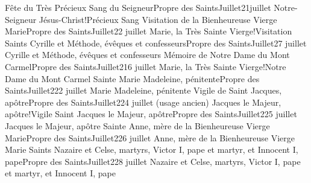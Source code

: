 \documentclass[twoside, french]{book}
\begin{document}
        {Fête du Très Précieux Sang du Seigneur}{Propre des Saints}{Juillet}{2}{1\ier juillet}
        {}{}{Notre-Seigneur Jésus-Christ!Précieux Sang}{}{}
        {Visitation de la Bienheureuse Vierge Marie}{Propre des Saints}{Juillet}{2}{2 juillet}
        {}{}{Marie, la Très Sainte Vierge!Visitation}{}{}
        {Saints Cyrille et Méthode, évêques et confesseurs}{Propre des Saints}{Juillet}{2}{7 juillet}
        {}{}{Cyrille et Méthode, évêques et confesseurs}{}{}
        {Mémoire de Notre Dame du Mont Carmel}{Propre des Saints}{Juillet}{2}{16 juillet}
        {}{}{Marie, la Très Sainte Vierge!Notre Dame du Mont Carmel}{}{}
        {Sainte Marie Madeleine, pénitente}{Propre des Saints}{Juillet}{2}{22 juillet}
        {}{}{Marie Madeleine, pénitente}{}{}
        {Vigile de Saint Jacques, apôtre}{Propre des Saints}{Juillet}{2}{24 juillet (usage ancien)}
        {}{}{Jacques le Majeur, apôtre!Vigile}{}{}
        {Saint Jacques le Majeur, apôtre}{Propre des Saints}{Juillet}{2}{25 juillet}
        {}{}{Jacques le Majeur, apôtre}{}{}
        {Sainte Anne, mère de la Bienheureuse Vierge Marie}{Propre des Saints}{Juillet}{2}{26 juillet}
        {}{}{Anne, mère de la Bienheureuse Vierge Marie}{}{}
        {Saints Nazaire et Celse, martyrs, Victor I\ier, pape et martyr, et Innocent I\ier, pape}{Propre des Saints}{Juillet}{2}{28 juillet}
        {}{}{Nazaire et Celse, martyrs, Victor I\ier, pape et martyr, et Innocent I\ier, pape}{}{}
\end{document}
